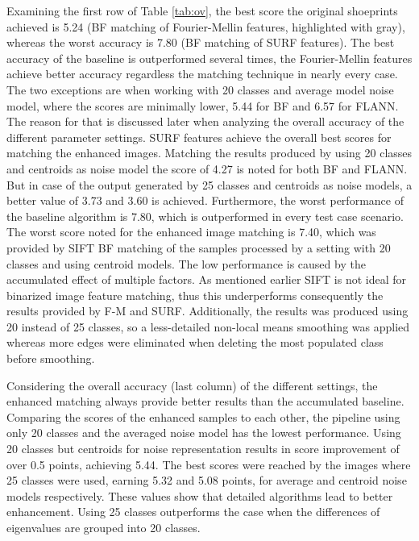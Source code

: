 \documentclass[draft,final]{vutinfth} %
\begin{document}
\par
Examining the first row of Table \ref{tab:ov}, the best score the original shoeprints achieved is 5.24 (BF matching of Fourier-Mellin features, highlighted with gray), whereas the worst accuracy is 7.80 (BF matching of SURF features).
The best accuracy of the baseline is outperformed several times, the Fourier-Mellin features achieve better accuracy regardless the matching technique in nearly every case.
The two exceptions are when working with 20 classes and average model noise model, where the scores are minimally lower, 5.44 for BF and 6.57 for FLANN.
The reason for that is discussed later when analyzing the overall accuracy of the different parameter settings.
SURF features achieve the overall best scores for matching the enhanced images.
Matching the results produced by using 20 classes and centroids as noise model the score of 4.27 is noted for both BF and FLANN.
But in case of the output generated by 25 classes and centroids as noise models, a better value of 3.73 and 3.60 is achieved.
Furthermore, the worst performance of the baseline algorithm is 7.80, which is outperformed in every test case scenario.
The worst score noted for the enhanced image matching is 7.40, which was provided by SIFT BF matching of the samples processed by a setting with 20 classes and using centroid models.
The low performance is caused by the accumulated effect of multiple factors.
As mentioned earlier SIFT is not ideal for binarized image feature matching, thus this underperforms consequently the results provided by F-M and SURF.
Additionally, the results was produced using 20 instead of 25 classes, so a less-detailed non-local means smoothing was applied whereas more edges were eliminated when deleting the most populated class before smoothing.
\par
Considering the overall accuracy (last column) of the different settings, the enhanced matching always provide better results than the accumulated baseline.
Comparing the scores of the enhanced samples to each other, the pipeline using only 20 classes and the averaged noise model has the lowest performance.
Using 20 classes but centroids for noise representation results in score improvement of over 0.5 points, achieving 5.44.
The best scores were reached by the images where 25 classes were used, earning 5.32 and 5.08 points, for average and centroid noise models respectively.
These values show that detailed algorithms lead to better enhancement.
Using 25 classes outperforms the case when the differences of eigenvalues are grouped into 20 classes.
\end{document}
